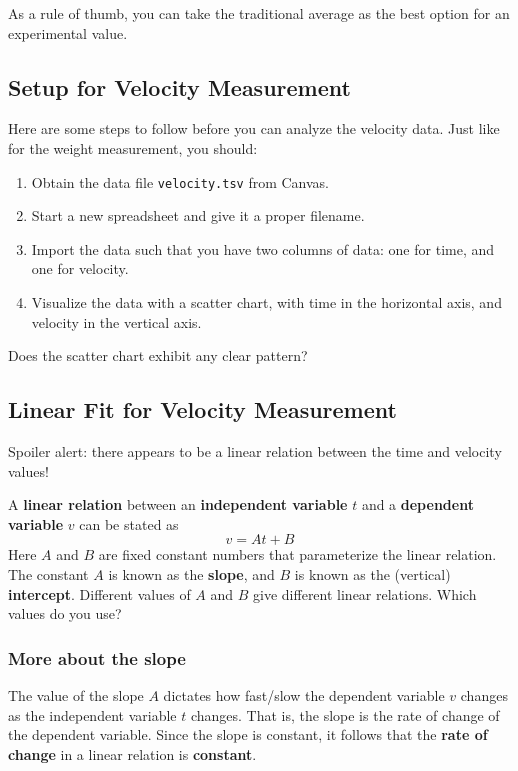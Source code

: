 As a rule of thumb, you can take the traditional average as the best option for an experimental value.
%
\subsection{Setup for Velocity Measurement}
%
Here are some steps to follow before you can analyze the velocity data. Just like for the weight measurement, you should:
\begin{enumerate}
    \item Obtain the data file \texttt{velocity.tsv} from Canvas.
    \item Start a new spreadsheet and give it a proper filename.
    \item Import the data such that you have two columns of data: one for time, and one for velocity.
    \item Visualize the data with a scatter chart, with time in the horizontal axis, and velocity in the vertical axis.
\end{enumerate}
Does the scatter chart exhibit any clear pattern?
%
\begin{center}
\end{center}
%
\subsection{Linear Fit for Velocity Measurement}
%
Spoiler alert: there appears to be a linear relation between the time and velocity values!

A \textbf{linear relation} between an \textbf{independent variable} $t$ and a \textbf{dependent variable} $v$ can be stated as
\begin{equation}
    v = A t + B
\end{equation}
Here $A$ and $B$ are fixed constant numbers that parameterize the linear relation. The constant $A$ is known as the \textbf{slope}, and $B$ is known as the (vertical) \textbf{intercept}. Different values of $A$ and $B$ give different linear relations. Which values do you use?
%
\subsubsection{More about the slope}
%
The value of the slope $A$ dictates how fast/slow the dependent variable $v$ changes as the independent variable $t$ changes. That is, the slope is the rate of change of the dependent variable. Since the slope is constant, it follows that the \textbf{rate of change} in a linear relation is \textbf{constant}.

